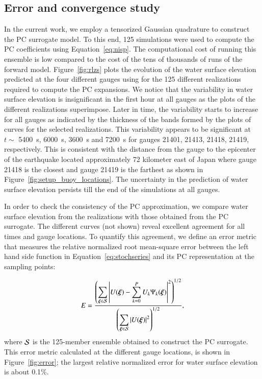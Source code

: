\subsection{Error and convergence study}
\label{sec:analysis}

In the current work, we employ a tensorized Gaussian quadrature to construct the PC surrogate
model. To this end, 125 \geoclaw simulations were used to compute the PC coefficients using Equation~\ref{eq:nisp}.
The computational cost of running this ensemble is low compared to the cost of the tens of thousands of 
runs of the forward model.  Figure~\ref{fig:rlzs} plots the evolution of the
water surface elevation predicted at the four different gauges 
using \geoclaw for the 125 different realizations 
required to compute the PC expansions. We notice that the 
variability in water surface elevation is insignificant in the first 
hour at all gauges as the plots of the different realizations superimpose.
Later in time, the variability starts to increase for all gauges 
as indicated by the thickness of the bands formed by the plots of curves for the selected realizations.
This variability appears to be significant at $t\sim$ 5400~s, 6000~s, 3600~s and 7200~s
for gauges 21401, 21413, 21418, 21419, respectively.
This is consistent with the distance from the gauge to the epicenter of the earthquake located approximately 72 kilometer east of Japan where gauge 21418 is the closest and gauge 21419 is the farthest as shown in Figure~\ref{fig:setup_buoy_locations}.
The uncertainty in the prediction of water surface  elevation persists till the end of the simulations
at all gauges.

In order to check the consistency of the PC approximation, we compare
water surface elevation from the realizations 
with those obtained from the PC surrogate. The different curves (not shown) 
reveal excellent agreement for all times and gauge locations.
To quantify this agreement, we define
an error metric that measures the relative normalized root mean-square error between the left hand side function 
in Equation~\eqref{eq:stochseries} and its PC representation at the sampling points:

\begin{equation} 
   E = \frac{\displaystyle
         \left(\sum_{\xxi \in \NISP} \left|U(\xxi) - \sum_{k = 0}^{P}
U_k\Psi_k(\xxi)\right|^2
         \right)^{1/2}}
        {\displaystyle
          \left(\sum_{\xxi \in \NISP} \left|U(\xxi)\right|^2\right)^{1/2} 
          },
\label{eq:error}
\end{equation}
where $\mathcal{S}$ is the 125-member ensemble obtained to construct the PC surrogate. 
This error metric calculated at the different gauge locations, is shown in Figure~\ref{fig:error};
the largest relative normalized error for 
water surface elevation is about 0.1\%. 


